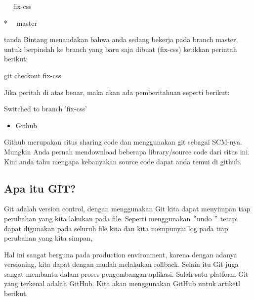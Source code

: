 \vspace{\baselineskip}
\noindent 
 \hspace*{0.5in} ~~ fix-css \par
 \vspace{\baselineskip}
\noindent 
 \hspace*{0.5in} *~~ master \par
\noindent 
tanda Bintang menandakan bahwa anda sedang bekerja pada branch master, untuk berpindah ke branch yang baru saja dibuat (fix-css) ketikkan perintah berikut: \par
\vspace{\baselineskip}
\noindent 
 \hspace*{0.5in} git checkout fix-css \par
\noindent 
Jika peritah di atas benar, maka akan ada pemberitahuan seperti berikut: \par
\noindent 
 \hspace*{0.5in} Switched to branch 'fix-css' \par
 \vspace{\baselineskip}
\noindent 
\begin{itemize}
\item Github\end{itemize}
 \par
\noindent 
 \hspace*{0.5in} Github merupakan situs sharing code dan menggunakan git sebagai SCM-nya. Mungkin Anda pernah mendownload beberapa library/source code dari situs ini. Kini anda tahu mengapa kebanyakan source code dapat anda temui di github. \par
\vspace{12pt}
\noindent 
 \subsection{Apa itu GIT?} 
\noindent 
Git adalah version control, dengan menggunakan Git kita dapat menyimpan tiap perubahan yang kita lakukan pada file. Seperti menggunakan  $ " $undo $ " $ tetapi dapat digunakan pada seluruh file kita dan kita mempunyai log pada tiap perubahan yang kita simpan,  \par
\noindent 
Hal ini sangat berguna pada production environment, karena dengan adanya versioning, kita dapat dengan mudah melakukan rollback. Selain itu Git juga sangat membantu dalam proses pengembangan aplikasi. Salah satu platform Git yang terkenal adalah GitHub. Kita akan menggunakan GitHub untuk artiketl berikut. \par
\vspace{12pt}
\noindent 
